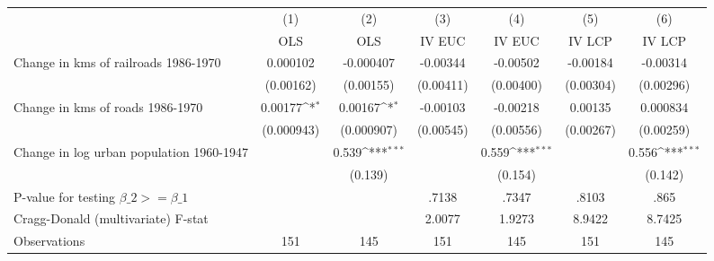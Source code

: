 {
\def\sym#1{\ifmmode^{#1}\else\(^{#1}\)\fi}
\begin{tabular}{l*{6}{c}}
\hline\hline
                &\multicolumn{1}{c}{(1)}&\multicolumn{1}{c}{(2)}&\multicolumn{1}{c}{(3)}&\multicolumn{1}{c}{(4)}&\multicolumn{1}{c}{(5)}&\multicolumn{1}{c}{(6)}\\
                &\multicolumn{1}{c}{OLS}&\multicolumn{1}{c}{OLS}&\multicolumn{1}{c}{IV EUC}&\multicolumn{1}{c}{IV EUC}&\multicolumn{1}{c}{IV LCP}&\multicolumn{1}{c}{IV LCP}\\
\hline
Change in kms of railroads 1986-1970& 0.000102         &-0.000407         & -0.00344         & -0.00502         & -0.00184         & -0.00314         \\
                &(0.00162)         &(0.00155)         &(0.00411)         &(0.00400)         &(0.00304)         &(0.00296)         \\
[1em]
Change in kms of roads 1986-1970&  0.00177\sym{*}  &  0.00167\sym{*}  & -0.00103         & -0.00218         &  0.00135         & 0.000834         \\
                &(0.000943)         &(0.000907)         &(0.00545)         &(0.00556)         &(0.00267)         &(0.00259)         \\
[1em]
Change in log urban population 1960-1947&                  &    0.539\sym{***}&                  &    0.559\sym{***}&                  &    0.556\sym{***}\\
                &                  &  (0.139)         &                  &  (0.154)         &                  &  (0.142)         \\
\hline
P-value for testing $\beta\_{2} >= \beta\_{1}$&                  &                  &    .7138         &    .7347         &    .8103         &     .865         \\
Cragg-Donald (multivariate) F-stat&                  &                  &   2.0077         &   1.9273         &   8.9422         &   8.7425         \\
Observations    &      151         &      145         &      151         &      145         &      151         &      145         \\
\hline\hline
\end{tabular}
}
